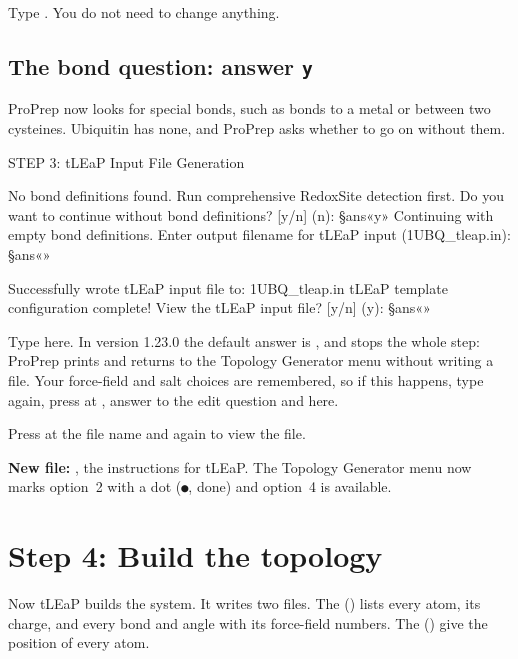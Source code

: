 Type . You do not need to change anything.

\subsection{The bond question: answer \texttt{y}}

ProPrep now looks for special bonds, such as bonds to a metal or between two
cysteines. Ubiquitin has none, and ProPrep asks whether to go on without them.

\begin{screen}
STEP 3: tLEaP Input File Generation

No bond definitions found. Run comprehensive RedoxSite detection first.
Do you want to continue without bond definitions? [y/n] (n): §ans«y»
Continuing with empty bond definitions.
Enter output filename for tLEaP input (1UBQ_tleap.in): §ans«»

Successfully wrote tLEaP input file to: 1UBQ_tleap.in
tLEaP template configuration complete!
View the tLEaP input file? [y/n] (y): §ans«»
\end{screen}

\begin{watchout}
Type  here. In version 1.23.0 the default answer is , and
 stops the whole step: ProPrep prints  and returns to the Topology Generator menu without
writing a file. Your force-field and salt choices are remembered, so if this
happens, type  again, press  at , answer  to the edit question and  here.
\end{watchout}

Press  at the file name and again to view the file.

\textbf{New file:} , the instructions for tLEaP. The
Topology Generator menu now marks option~2 with a dot (\texttt{●}, done) and option~4 is
available.

\section{Step 4: Build the topology}\label{sec:tutorial-build}

Now tLEaP builds the system. It writes two files. The 
() lists every atom, its charge, and every bond and angle with
its force-field numbers. The  () give the
position of every atom.

